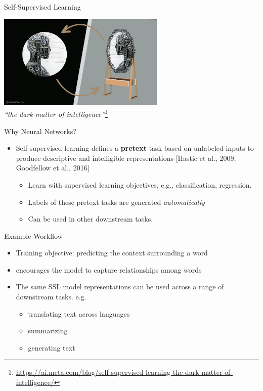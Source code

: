 \documentclass[serif, aspectratio=169]{beamer}
\begin{document}
\begin{frame}{Self-Supervised Learning}
    \begin{center}
        \includegraphics[width=0.6\textwidth]{pic/Intro.png} %
        \\[1cm] %
        \textit{“the dark matter of intelligence”}\footnote{\scriptsize \url{https://ai.meta.com/blog/self-supervised-learning-the-dark-matter-of-intelligence/}}
    \end{center}
\end{frame}

\begin{frame}{Why Neural Networks?}
    \begin{itemize}
        \item  Self-supervised learning defines a \textbf{pretext} task based on unlabeled inputs to produce descriptive and intelligible representations [Hastie et al., 2009, Goodfellow et al., 2016]
        \begin{itemize}
            \item Learn with supervised learning objectives, e.g., classification, regression.
	\item Labels of these pretext tasks are generated \textit{automatically}
	\item Can be used in other downstream tasks.
        \end{itemize}
    \end{itemize}
\end{frame}


\begin{frame}[t]{Example Workflow}
    
    \begin{itemize}
\item Training objective: predicting the context surrounding a word
\item encourages the model to capture relationships among words
\item The same SSL model representations can be used across a range
 of downstream tasks. e.g.
        \begin{itemize}
	\item translating text across languages
	\item summarizing
	\item generating text
        \end{itemize}
    \end{itemize}

\end{frame}
\end{document}

